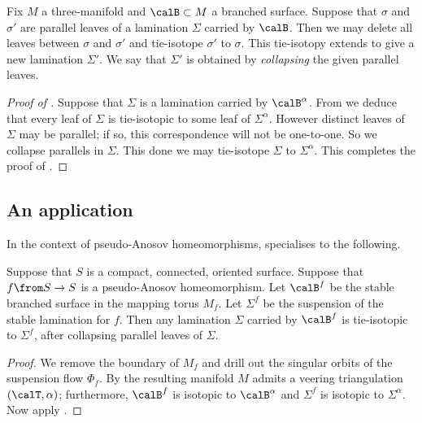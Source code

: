 \documentclass[12pt]{amsart}
\begin{document}
\begin{definition}
\label{Def:Collapse}
Fix $M$ a three-manifold and $\calB \subset M$ a branched surface.  Suppose that $\sigma$ and $\sigma'$ are parallel leaves of a lamination $\Sigma$ carried by $\calB$.  Then we may delete all leaves between $\sigma$ and $\sigma'$ and tie-isotope $\sigma'$ to $\sigma$. This tie-isotopy extends to give a new lamination $\Sigma'$. We say that $\Sigma'$ is obtained by \emph{collapsing} the given parallel leaves.
\end{definition}

\begin{proof}[Proof of ] 
Suppose that $\Sigma$ is a lamination carried by $\calB^\alpha$.  From  we deduce that every leaf of $\Sigma$ is tie-isotopic to some leaf of $\Sigma^\alpha$.  However distinct leaves of $\Sigma$ may be parallel; if so, this correspondence will not be one-to-one. So we collapse parallels in $\Sigma$.  This done we may tie-isotope $\Sigma$ to $\Sigma^\alpha$.  This completes the proof of .  
\end{proof}

\subsection{An application}

In the context of pseudo-Anosov homeomorphisms,  specialises to the following. 

\begin{corollary}
\label{Cor:Surprise}
Suppose that $S$ is a compact, connected, oriented surface.  Suppose that $f \from S \to S$ is a pseudo-Anosov homeomorphism.  Let $\calB^f$ be the stable branched surface in the mapping torus $M_f$. Let $\Sigma^f$ be the suspension of the stable lamination for $f$. Then any lamination $\Sigma$ carried by $\calB^f$ is tie-isotopic to $\Sigma^f$, after collapsing parallel leaves of $\Sigma$.  
\end{corollary}

\begin{proof}
We remove the boundary of $M_f$ and drill out the singular orbits of the suspension flow $\Phi_f$.  By \cite[Main~Construction]{Agol11} the resulting manifold $M$ admits a veering triangulation $(\calT, \alpha)$; furthermore, $\calB^f$ is isotopic to $\calB^\alpha$ and $\Sigma^f$ is isotopic to $\Sigma^\alpha$.  Now apply .
\end{proof}
\end{document}
